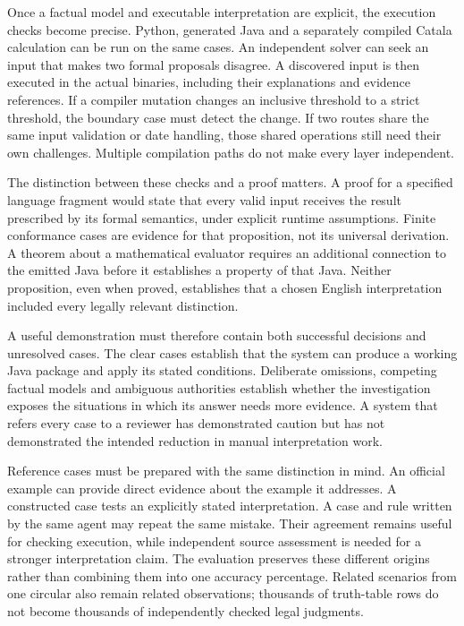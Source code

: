 \documentclass[12pt,a4paper,oneside,openany]{book}
\begin{document}
Once a factual model and executable interpretation are explicit, the execution
checks become precise. Python, generated Java and a separately compiled Catala
calculation can be run on the same cases. An independent solver can seek an
input that makes two formal proposals disagree. A discovered input is then
executed in the actual binaries, including their explanations and evidence
references. If a compiler mutation changes an inclusive threshold to a strict
threshold, the boundary case must detect the change. If two routes share the
same input validation or date handling, those shared operations still need
their own challenges. Multiple compilation paths do not make every layer
independent.

The distinction between these checks and a proof matters. A proof for a
specified language fragment would state that every valid input receives the
result prescribed by its formal semantics, under explicit runtime assumptions.
Finite conformance cases are evidence for that proposition, not its universal
derivation. A theorem about a mathematical evaluator requires an additional
connection to the emitted Java before it establishes a property of that Java.
Neither proposition, even when proved, establishes that a chosen English
interpretation included every legally relevant distinction.

A useful demonstration must therefore contain both successful decisions and
unresolved cases. The clear cases establish that the system can produce a
working Java package and apply its stated conditions. Deliberate omissions,
competing factual models and ambiguous authorities establish whether the
investigation exposes the situations in which its answer needs more evidence.
A system that refers every case to a reviewer has demonstrated caution but
has not demonstrated the intended reduction in manual interpretation work.

Reference cases must be prepared with the same distinction in mind. An official
example can provide direct evidence about the example it addresses. A constructed
case tests an explicitly stated interpretation. A case and rule written by the
same agent may repeat the same mistake. Their agreement remains useful for
checking execution, while independent source assessment is needed for a stronger
interpretation claim. The evaluation preserves these different origins rather
than combining them into one accuracy percentage. Related scenarios from one
circular also remain related observations; thousands of truth-table rows do not
become thousands of independently checked legal judgments.
\end{document}
